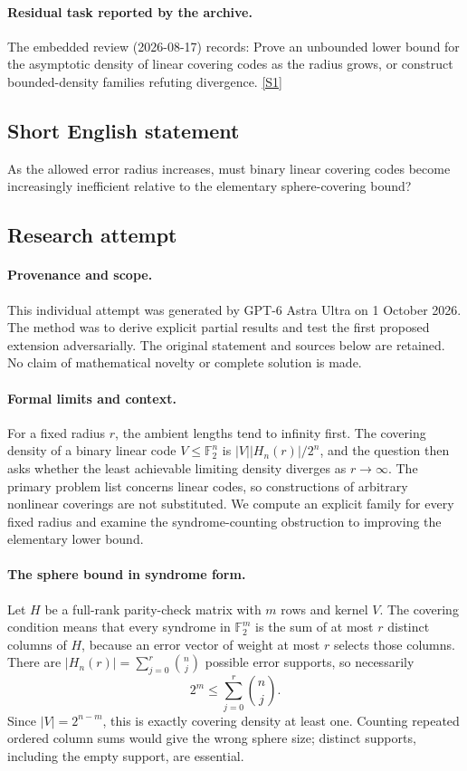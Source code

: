 \documentclass[11pt,a4paper]{article}
\newcommand{\F}{\mathbb{F}}
\newcommand{\sref}[2]{\hyperlink{source:#1:#2}{[S#2]}}
\begin{document}
\paragraph{Residual task reported by the archive.}

The embedded review (2026-08-17) records: Prove an unbounded lower bound for the asymptotic density of linear covering codes as the radius grows, or construct bounded-density families refuting divergence. \sref{170}{1}

\subsection{Short English statement}

As the allowed error radius increases, must binary linear covering codes become increasingly inefficient relative to the elementary sphere-covering bound?

\subsection{Research attempt}

\paragraph{Provenance and scope.}
This individual attempt was generated by GPT-6 Astra Ultra on 1 October 2026. The method was to derive explicit partial results and test the first proposed extension adversarially. The original statement and sources below are retained. No claim of mathematical novelty or complete solution is made.

\paragraph{Formal limits and context.}
For a fixed radius $r$, the ambient lengths tend to infinity first. The covering density of a binary linear code $V\leq\F_2^n$ is $|V||H_n(r)|/2^n$, and the question then asks whether the least achievable limiting density diverges as $r\to\infty$. The primary problem list concerns linear codes, so constructions of arbitrary nonlinear coverings are not substituted. We compute an explicit family for every fixed radius and examine the syndrome-counting obstruction to improving the elementary lower bound.

\paragraph{The sphere bound in syndrome form.}
Let $H$ be a full-rank parity-check matrix with $m$ rows and kernel $V$. The covering condition means that every syndrome in $\F_2^m$ is the sum of at most $r$ distinct columns of $H$, because an error vector of weight at most $r$ selects those columns. There are $|H_n(r)|=\sum_{j=0}^r\binom nj$ possible error supports, so necessarily
\[
 2^m\leq\sum_{j=0}^r\binom nj.
\]
Since $|V|=2^{n-m}$, this is exactly covering density at least one. Counting repeated ordered column sums would give the wrong sphere size; distinct supports, including the empty support, are essential.
\end{document}
